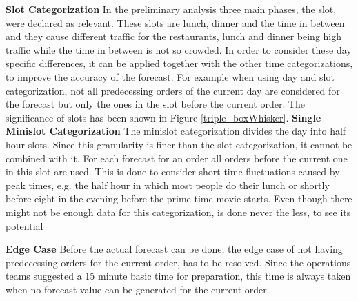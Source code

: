 \newline\newline\textbf{Slot Categorization}\newline
In the preliminary analysis three main phases, the slot, were declared as relevant. These slots are lunch, dinner and the time in between and they cause different traffic for the restaurants, lunch and dinner being high traffic while the time in between is not so crowded. In order to consider these day specific differences, it can be applied together with the other time categorizations, to improve the accuracy of the forecast. For example when using day and slot categorization, not all predecessing orders of the current day are considered for the forecast but only the ones in the slot before the current order. The significance of slots has been shown in Figure \ref{triple_boxWhisker}.
\newline\newline\textbf{Single Minislot Categorization}\newline
The minislot categorization divides the day into half hour slots. Since this granularity is finer than the slot categorization, it cannot be combined with it. For each forecast for an order all orders before the current one in this slot are used. This is done to consider short time fluctuations caused by peak times, e.g. the half hour in which most people do their lunch or shortly before eight in the evening before the prime time movie starts.\newline
Even though there might not be enough data for this categorization, is done never the less, to see its potential


\newline\newline\textbf{Edge Case}\newline
Before the actual forecast can be done, the edge case of not having predecessing orders for the current order, has to be resolved. Since the operations teams suggested a 15 minute basic time for preparation, this time is always taken when no forecast value can be generated for the current order.
